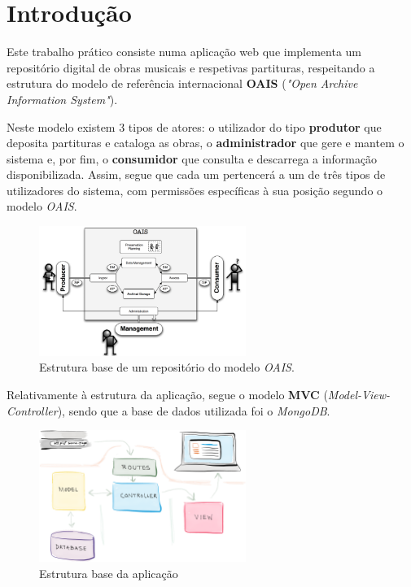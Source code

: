 \section{Introdução}
Este trabalho prático consiste numa aplicação web que implementa um repositório digital de obras musicais e respetivas partituras, respeitando a estrutura do modelo de referência internacional \textbf{OAIS} (\textit{"Open Archive Information System"}).

Neste modelo existem 3 tipos de atores: o utilizador do tipo \textbf{produtor} que deposita partituras e cataloga as obras, o \textbf{administrador} que gere e mantem o sistema e, por fim, o \textbf{consumidor} que consulta e descarrega a informação disponibilizada. Assim, segue que cada um pertencerá a um de três tipos de utilizadores do sistema, com permissões específicas à sua posição segundo o modelo \textit{OAIS}.

\begin{figure}[H]
\begin{center}
    \includegraphics[width = 0.6\textwidth, keepaspectratio]{imgs/OAIS.png}
    \caption{Estrutura base de um repositório do modelo \textit{OAIS}.}
    \label{fig:oais}
\end{center}
\end{figure}

Relativamente à estrutura da aplicação, segue o modelo \textbf{MVC} (\textit{Model-View-Controller}), sendo que a base de dados utilizada foi o \textit{MongoDB}.

\begin{figure}[H]
\begin{center}
    \includegraphics[width = 0.6\textwidth, keepaspectratio]{imgs/mvc.png}
    \caption{Estrutura base da aplicação}
    \label{fig:mvc}
\end{center}
\end{figure}